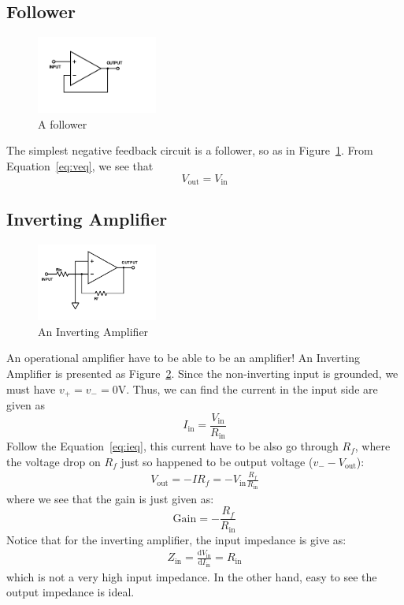 \documentclass[aps,prl,reprint]{revtex4-1}
\newcommand{\de}{\mathrm{d}}
\begin{document}
    \subsection{Follower}
        \begin{figure}[h]
            \centering
            \includegraphics[height=1in]{image/Amp-Follower.pdf}
            \caption{A follower}
            \label{fig:follower}
        \end{figure}{}
        The simplest negative feedback circuit is a follower, so as in Figure~\ref{fig:follower}. From Equation~\ref{eq:veq}, we see that
        \begin{equation}
            V_\text{out} = V_\text{in}
        \end{equation}
    \subsection{Inverting Amplifier}
        \begin{figure}[h]
            \centering
            \includegraphics[height=1in]{image/Inverting-Amp.pdf}
            \caption{An Inverting Amplifier}
            \label{fig:invertingAmplifier}
        \end{figure}{}
        An operational amplifier have to be able to be an amplifier! An Inverting Amplifier is presented as Figure~\ref{fig:invertingAmplifier}. Since the non-inverting input is grounded, we must have $v_+ = v_- = 0$V. Thus, we can find the current in the input side are given as
        \[
        I_\text{in} = \frac{V_\text{in}}{R_\text{in}}
        \]
        Follow the Equation~\ref{eq:ieq}, this current have to be also go through $R_f$, where the voltage drop on $R_f$ just so happened to be output voltage ($v_- - V_\text{out}$):
        \begin{align}
            V_\text{out} = - I R_f = - V_\text{in}\frac{R_f}{R_\text{in}} \label{eq:invertingAmplifier}
        \end{align}
        where we see that the gain is just given as:
        \[
            \text{Gain} = - \frac{R_f}{R_\text{in}}
        \]
        Notice that for the inverting amplifier, the input impedance is give as:
        \begin{align*}
            Z_\text{in} = \frac{\de V_\text{in}}{\de I_\text{in}} = R_\text{in}
        \end{align*}
        which is not a very high input impedance. In the other hand, easy to see the output impedance is ideal.
\end{document}
